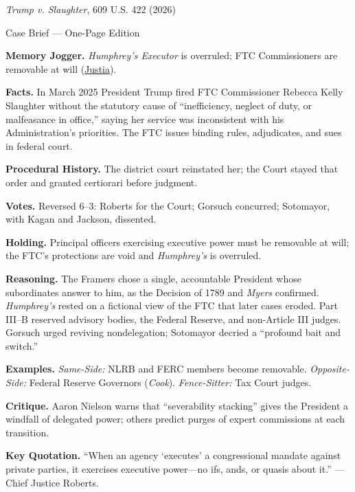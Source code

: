\documentclass[12pt]{article}
\begin{document}
\begin{center}
{\Large \textit{Trump v. Slaughter}, 609 U.S. 422 (2026)\par}
\vspace{0.3em}
{\normalsize Case Brief --- One-Page Edition\par}
\end{center}

\textbf{Memory Jogger.} \textit{Humphrey's Executor} is overruled; FTC Commissioners are removable at will (\href{https://supreme.justia.com/cases/federal/us/609/25-332/}{Justia}).

\textbf{Facts.} In March 2025 President Trump fired FTC Commissioner Rebecca Kelly Slaughter without the statutory cause of ``inefficiency, neglect of duty, or malfeasance in office,'' saying her service was inconsistent with his Administration's priorities. The FTC issues binding rules, adjudicates, and sues in federal court.

\textbf{Procedural History.} The district court reinstated her; the Court stayed that order and granted certiorari before judgment.

\textbf{Votes.} Reversed 6--3: Roberts for the Court; Gorsuch concurred; Sotomayor, with Kagan and Jackson, dissented.

\textbf{Holding.} Principal officers exercising executive power must be removable at will; the FTC's protections are void and \textit{Humphrey's} is overruled.

\textbf{Reasoning.} The Framers chose a single, accountable President whose subordinates answer to him, as the Decision of 1789 and \textit{Myers} confirmed. \textit{Humphrey's} rested on a fictional view of the FTC that later cases eroded. Part III--B reserved advisory bodies, the Federal Reserve, and non-Article III judges. Gorsuch urged reviving nondelegation; Sotomayor decried a ``profound bait and switch.''

\textbf{Examples.} \emph{Same-Side:} NLRB and FERC members become removable. \emph{Opposite-Side:} Federal Reserve Governors (\textit{Cook}). \emph{Fence-Sitter:} Tax Court judges.

\textbf{Critique.} Aaron Nielson warns that ``severability stacking'' gives the President a windfall of delegated power; others predict purges of expert commissions at each transition.

\textbf{Key Quotation.} ``When an agency `executes' a congressional mandate against private parties, it exercises executive power---no ifs, ands, or quasis about it.'' --- Chief Justice Roberts.
\end{document}
